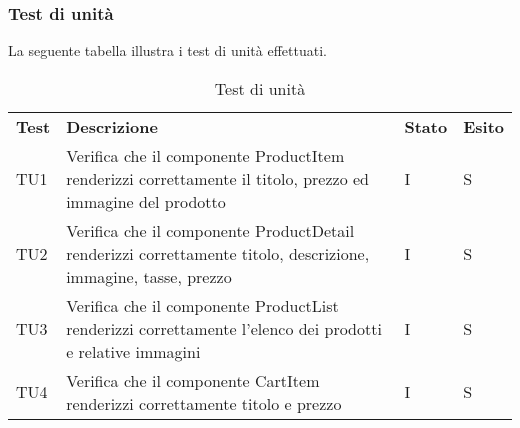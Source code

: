 \subsubsection{Test di unità}
La seguente tabella illustra i test di unità effettuati.
\begin{center}
    \centering
    \renewcommand{\arraystretch}{1.8}
    \label{tab:TestUnita}
    \begin{longtable}[!h]{p{45px} p{255px} p{35px} p{35px}}
        \caption{Test di unità}                                                                                                                                                                                                                                                                                    \\
        \rowcolor{logo!70}
        \textbf{Test} & \textbf{Descrizione}                                                                                                                                                                                                                                     & \textbf{Stato} & \textbf{Esito} \\
        TU1           & Verifica che il componente ProductItem renderizzi correttamente il titolo, prezzo ed immagine del prodotto                                                                                                                                               & I              & S              \\
        TU2           & Verifica che il componente ProductDetail renderizzi correttamente titolo, descrizione, immagine, tasse, prezzo                                                                                                                                           & I              & S              \\
        TU3           & Verifica che il componente ProductList renderizzi correttamente l'elenco dei prodotti e relative immagini                                                                                                                                                & I              & S              \\
        TU4           & Verifica che il componente CartItem renderizzi correttamente titolo e prezzo                                                                                                                                                                             & I              & S              \\

\end{longtable}
\end{center}

